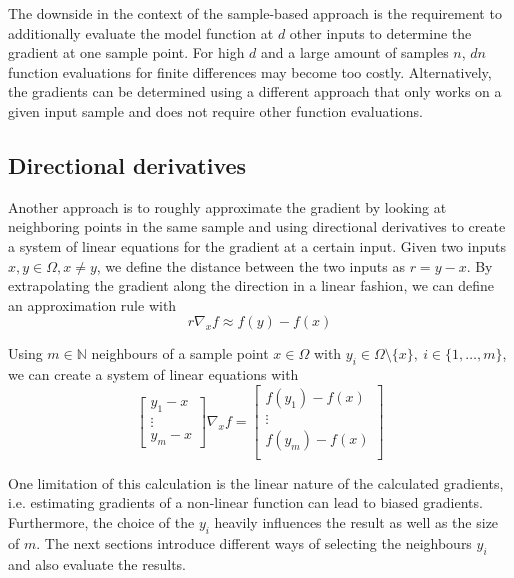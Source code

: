 \documentclass[
  a4paper,  %
  twoside,  %
  bibliography=totoc,
  headsepline,
  cleardoublepage=empty,
  parskip=half,
  draft=false
]{scrbook}
\begin{document}
The downside in the context of the sample-based approach is the requirement to additionally evaluate the model function at $d$ other inputs to determine the gradient at one sample point.
For high $d$ and a large amount of samples $n$, $dn$ function evaluations for finite differences may become too costly.
Alternatively, the gradients can be determined using a different approach that only works on a given input sample and does not require other function evaluations.

\subsection{Directional derivatives}

Another approach is to roughly approximate the gradient by looking at neighboring points in the same sample and using directional derivatives to create a system of linear equations for the gradient at a certain input.
Given two inputs $x, y \in \Omega, x \neq y$, we define the distance between the two inputs as $r=y-x$.
By extrapolating the gradient along the direction in a linear fashion, we can define an approximation rule with
\begin{equation}
r \nabla_x f \approx f(y) - f(x)
\end{equation}

Using $m \in \mathds{N}$ neighbours of a sample point $x \in \Omega$ with $y_i \in \Omega \setminus \{x\}, ~ i \in \{1, \dots, m\}$, we can create a system of linear equations with
\begin{equation}
\begin{bmatrix}
    y_1 - x\\
    \vdots \\
    y_m - x
  \end{bmatrix}  \nabla_x f =\begin{bmatrix}
    f(y_1) - f(x) \\ \vdots \\  f(y_m) - f(x)
    \\
  \end{bmatrix}
  \label{dd_sle}
\end{equation}

One limitation of this calculation is the linear nature of the calculated gradients, i.e. estimating gradients of a non-linear function can lead to biased gradients.
Furthermore, the choice of the $y_i$ heavily influences the result as well as the size of $m$.
The next sections introduce different ways of selecting the neighbours $y_i$ and also evaluate the results.
\end{document}

